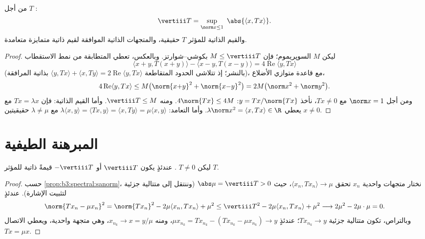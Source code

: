 \begin{proposition}\label{prop:b3:spectral:sanorm}
من أجل $T$ :
\[
\vertiii T = \sup_{\norm x \leq 1}\ \abs{\langle x,
Tx\rangle} .
\]
والقيم الذاتية للمؤثر $T$ حقيقية، والمتجهات الذاتية الموافقة
لقيم ذاتية متمايزة متعامدة.
\end{proposition}

\begin{proof}
ليكن $M$ السوپريموم؛ فإن $M \leq \vertiii T$ بكوشي--شوارتز. وبالعكس، تعطي
المتطابقة من نمط الاستقطاب
\[
\langle x{+}y, T(x{+}y)\rangle - \langle x{-}y,
T(x{-}y)\rangle = 4\operatorname{Re}\langle y, Tx\rangle
\]
(بالنشر؛ إذ تتلاشى الحدود المتقاطعة $\langle y, Tx\rangle + \langle x,
Ty\rangle = 2\operatorname{Re}\langle y, Tx\rangle$ بذاتية المرافقة)،
مع قاعدة متوازي الأضلاع،
\[
4\operatorname{Re}\langle y, Tx\rangle \leq
M\bigl(\norm{x{+}y}^2 + \norm{x{-}y}^2\bigr) = 2M\bigl(\norm
x^2 + \norm y^2\bigr).
\]
ومن أجل $\norm x = 1$ مع $Tx \neq 0$، نأخذ $y = Tx/\norm{Tx}$: $4\norm{Tx} \leq 4M$. ومنه
$\vertiii T \leq M$. وأما القيم الذاتية: فإن $Tx = \lambda x$ مع $x \ne 0$
يعطي $\lambda\norm x^2 = \langle
x, Tx\rangle \in \R$. وأما التعامد: $\lambda\langle x,
y\rangle = \langle Tx, y\rangle = \langle x, Ty\rangle =
\mu\langle x, y\rangle$ مع $\lambda \neq \mu$ حقيقيتين.
\end{proof}

\section{المبرهنة الطيفية}

\begin{lemma}
\label{lem:b3:spectral:existence}
ليكن $T \neq 0$  . عندئذٍ يكون
$\vertiii T$ أو $-\vertiii T$ قيمةً ذاتية للمؤثر $T$.
\end{lemma}

\begin{proof}
حسب \cref{prop:b3:spectral:sanorm}، نختار متجهات واحدية $x_n$ تحقق $\langle x_n, Tx_n\rangle \to \mu$، حيث
$\abs\mu =
\vertiii T > 0$ (وننتقل إلى متتالية جزئية لتثبيت الإشارة). عندئذٍ
\[
\norm{Tx_n - \mu x_n}^2
= \norm{Tx_n}^2 - 2\mu\langle x_n, Tx_n\rangle + \mu^2
\leq \vertiii T^2 - 2\mu\langle x_n, Tx_n\rangle + \mu^2
\longrightarrow 2\mu^2 - 2\mu\cdot\mu = 0 .
\]
وبالتراص، تكون متتالية جزئية $Tx_{n_k} \to y$؛ عندئذٍ $\mu
x_{n_k} = Tx_{n_k} - (Tx_{n_k} - \mu x_{n_k}) \to y$،
ومنه $x_{n_k} \to x = y/\mu$، وهي متجهة واحدية، ويعطي الاتصال $Tx = \mu x$.
\end{proof}

